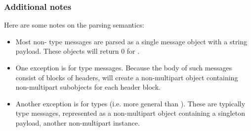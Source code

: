 \subsubsection{Additional notes}

Here are some notes on the parsing semantics:

\begin{itemize}
\item Most non- type messages are parsed as a single
      message object with a string payload.  These objects will return
      0 for .
\item One exception is for  type
      messages.  Because the body of such messages consist of
      blocks of headers,  will create a non-multipart
      object containing non-multipart subobjects for each header
      block.
\item Another exception is for  types (i.e. more
      general than ).  These are
      typically  type messages, represented as a
      non-multipart object containing a singleton payload, another
      non-multipart  instance.
\end{itemize}

